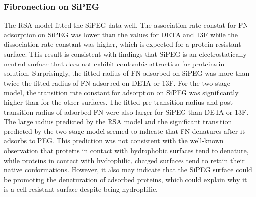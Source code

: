 \subsubsection{Fibronection on SiPEG}

The RSA model fitted the SiPEG data well. The association rate constat
for FN adsorption on SiPEG was lower than the values for DETA and
13F while the dissociation rate constant was higher, which is expected
for a protein-resistant surface. This result is consistent with findings
that SiPEG is an electrostatically neutral surface that does not exhibit
coulombic attraction for proteins in solution. Surprisingly, the fitted
radius of FN adsorbed on SiPEG was more than twice the fitted radius
of FN adsorbed on DETA or 13F. For the two-stage model, the transition
rate constant for adsorption on SiPEG was significantly higher than
for the other surfaces. The fitted pre-transition radius and post-transition
radius of adsorbed FN were also larger for SiPEG than DETA or 13F.
The large radius predicted by the RSA model and the significant transition
predicted by the two-stage model seemed to indicate that FN denatures
after it adsorbs to PEG. This prediction was not consistent with the
well-known observation that proteins in contact with hydrophobic surfaces
tend to denature, while proteins in contact with hydrophilic, charged
surfaces tend to retain their native conformations. However, it also
may indicate that the SiPEG surface could be promoting the denaturation
of adsorbed proteins, which could explain why it is a cell-resistant
surface despite being hydrophilic. 

